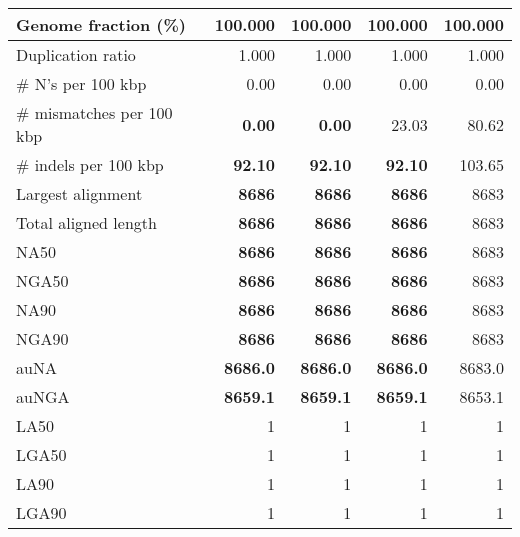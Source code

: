 \documentclass[12pt,a4paper]{article}
\begin{document}
\begin{table}[ht]
\begin{center}
\begin{tabular}{|l*{4}{|r}|}
Genome fraction (\%) & 100.000 & 100.000 & 100.000 & 100.000 \\ \hline
Duplication ratio & 1.000 & 1.000 & 1.000 & 1.000 \\ \hline
\# N's per 100 kbp & 0.00 & 0.00 & 0.00 & 0.00 \\ \hline
\# mismatches per 100 kbp & {\bf 0.00} & {\bf 0.00} & 23.03 & 80.62 \\ \hline
\# indels per 100 kbp & {\bf 92.10} & {\bf 92.10} & {\bf 92.10} & 103.65 \\ \hline
Largest alignment & {\bf 8686} & {\bf 8686} & {\bf 8686} & 8683 \\ \hline
Total aligned length & {\bf 8686} & {\bf 8686} & {\bf 8686} & 8683 \\ \hline
NA50 & {\bf 8686} & {\bf 8686} & {\bf 8686} & 8683 \\ \hline
NGA50 & {\bf 8686} & {\bf 8686} & {\bf 8686} & 8683 \\ \hline
NA90 & {\bf 8686} & {\bf 8686} & {\bf 8686} & 8683 \\ \hline
NGA90 & {\bf 8686} & {\bf 8686} & {\bf 8686} & 8683 \\ \hline
auNA & {\bf 8686.0} & {\bf 8686.0} & {\bf 8686.0} & 8683.0 \\ \hline
auNGA & {\bf 8659.1} & {\bf 8659.1} & {\bf 8659.1} & 8653.1 \\ \hline
LA50 & 1 & 1 & 1 & 1 \\ \hline
LGA50 & 1 & 1 & 1 & 1 \\ \hline
LA90 & 1 & 1 & 1 & 1 \\ \hline
LGA90 & 1 & 1 & 1 & 1 \\ \hline
\end{tabular}
\end{center}
\end{table}
\end{document}
